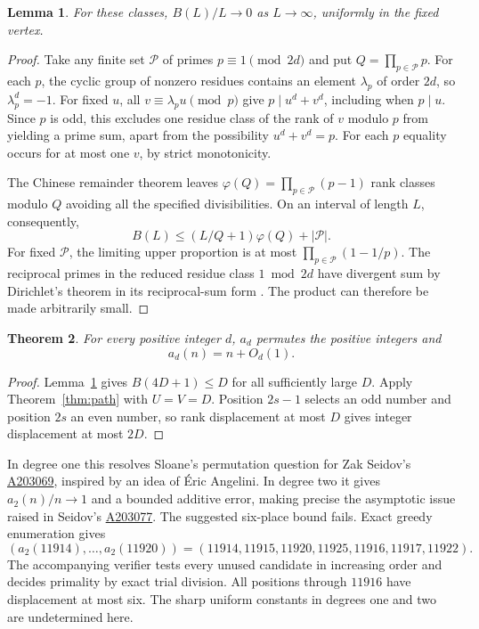 \documentclass[11pt,letterpaper]{article}
\newtheorem{theorem}{Theorem}
\newtheorem{lemma}[theorem]{Lemma}
\newcommand{\oeis}[1]{\href{https://oeis.org/A#1}{A#1}}
\begin{document}
\begin{lemma}\label{lem:sieve}
For these classes, $B(L)/L\to0$ as $L\to\infty$, uniformly in the fixed vertex.
\end{lemma}
\begin{proof}
Take any finite set $\mathcal P$ of primes $p\equiv1\pmod{2d}$ and put $Q=\prod_{p\in\mathcal P}p$. For each $p$, the cyclic group of nonzero residues contains an element $\lambda_p$ of order $2d$, so $\lambda_p^d=-1$. For fixed $u$, all $v\equiv\lambda_pu\pmod p$ give $p\mid u^d+v^d$, including when $p\mid u$. Since $p$ is odd, this excludes one residue class of the rank of $v$ modulo $p$ from yielding a prime sum, apart from the possibility $u^d+v^d=p$. For each $p$ equality occurs for at most one $v$, by strict monotonicity.

The Chinese remainder theorem leaves $\varphi(Q)=\prod_{p\in\mathcal P}(p-1)$ rank classes modulo $Q$ avoiding all the specified divisibilities. On an interval of length $L$, consequently,
\[
 B(L)\le (L/Q+1)\varphi(Q)+|\mathcal P|.
\]
For fixed $\mathcal P$, the limiting upper proportion is at most $\prod_{p\in\mathcal P}(1-1/p)$. The reciprocal primes in the reduced residue class $1\bmod 2d$ have divergent sum by Dirichlet's theorem in its reciprocal-sum form \cite{davenport}. The product can therefore be made arbitrarily small.
\end{proof}

\begin{theorem}
For every positive integer $d$, $a_d$ permutes the positive integers and
\[
                      a_d(n)=n+O_d(1).
\]
\end{theorem}
\begin{proof}
Lemma~\ref{lem:sieve} gives $B(4D+1)\le D$ for all sufficiently large $D$. Apply Theorem~\ref{thm:path} with $U=V=D$. Position $2s-1$ selects an odd number and position $2s$ an even number, so rank displacement at most $D$ gives integer displacement at most $2D$.
\end{proof}

In degree one this resolves Sloane's permutation question for Zak Seidov's \oeis{203069}, inspired by an idea of \'Eric Angelini. In degree two it gives $a_2(n)/n\to1$ and a bounded additive error, making precise the asymptotic issue raised in Seidov's \oeis{203077}. The suggested six-place bound fails. Exact greedy enumeration gives
\[
(a_2(11914),\ldots,a_2(11920))
   =(11914,11915,11920,11925,11916,11917,11922).
\]
The accompanying verifier tests every unused candidate in increasing order and decides primality by exact trial division. All positions through $11916$ have displacement at most six. The sharp uniform constants in degrees one and two are undetermined here.
\end{document}
